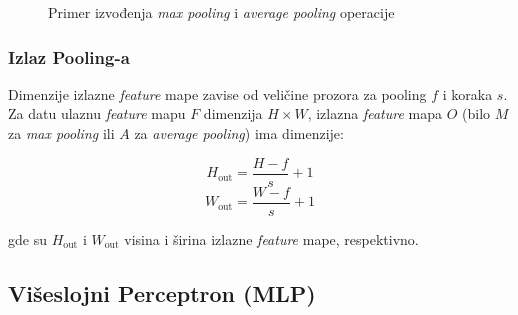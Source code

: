 \documentclass[12pt]{article}
\begin{document}
   
   \begin{figure}[h!]
      \centering
      \caption{Primer izvođenja \textit{max pooling} i \textit{average pooling} operacije}
      \label{fig:max_avg_pooling}
    \end{figure}

   \subsubsection*{Izlaz Pooling-a}

   Dimenzije izlazne \textit{feature} mape zavise od veličine prozora za pooling \( f \) i koraka \( s \). 
   Za datu ulaznu \textit{feature} mapu \( F \) dimenzija \( H \times W \), izlazna \textit{feature} mapa \( O \) 
   (bilo \( M \) za \textit{max pooling} ili \( A \) za \textit{average pooling}) ima dimenzije:
   
   \[
   H_{\text{out}} = \frac{H - f}{s} + 1
   \]
   \[
   W_{\text{out}} = \frac{W - f}{s} + 1
   \]
   
   gde su \( H_{\text{out}} \) i \( W_{\text{out}} \) visina i širina izlazne \textit{feature} mape, respektivno.
   
    \newpage
   \subsection*{Višeslojni Perceptron (MLP)}
\end{document}
